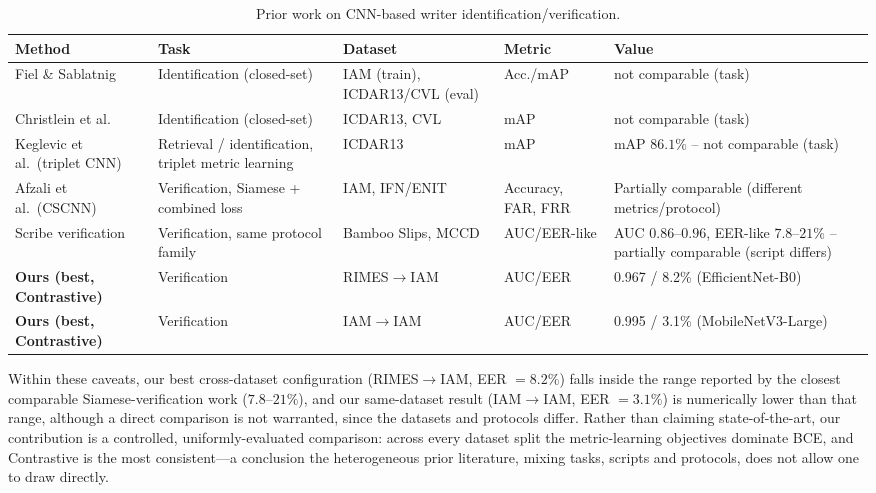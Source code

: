 \begin{table}[htbp]
  \centering
  \caption{Prior work on CNN-based writer identification/verification.}
  \label{tab:sota}
  \footnotesize
  \begin{tabularx}{\textwidth}{@{}l L L l L@{}}
    \toprule
    Method & Task & Dataset & Metric & Value \\
    \midrule
    Fiel \& Sablatnig~\cite{fiel2015} & Identification (closed-set) & IAM (train), ICDAR13/CVL (eval) & Acc./mAP & not comparable (task) \\
    Christlein et al.~\cite{christlein2017} & Identification (closed-set) & ICDAR13, CVL & mAP & not comparable (task) \\
    Keglevic et al.\ (triplet CNN)~\cite{keglevic2018} & Retrieval / identification, triplet metric learning & ICDAR13 & mAP & mAP $86.1\%$ -- not comparable (task) \\
    Afzali et al.\ (CSCNN)~\cite{afzali2024} & Verification, Siamese + combined loss & IAM, IFN/ENIT & Accuracy, FAR, FRR & Partially comparable (different metrics/protocol) \\
    Scribe verification~\cite{scribeverif2026} & Verification, same protocol family & Bamboo Slips, MCCD & AUC/EER-like & AUC $0.86$--$0.96$, EER-like $7.8$--$21\%$ -- partially comparable (script differs) \\
    \textbf{Ours (best, Contrastive)} & Verification & RIMES$\to$IAM & AUC/EER & 0.967 / 8.2\% (EfficientNet-B0) \\
    \textbf{Ours (best, Contrastive)} & Verification & IAM$\to$IAM & AUC/EER & 0.995 / 3.1\% (MobileNetV3-Large) \\
    \bottomrule
  \end{tabularx}
\end{table}

Within these caveats, our best cross-dataset configuration
(RIMES$\rightarrow$IAM, EER $=8.2\%$) falls inside the range reported by the
closest comparable Siamese-verification work ($7.8$--$21\%$), and our
same-dataset result (IAM$\rightarrow$IAM, EER $=3.1\%$) is numerically lower
than that range, although a direct comparison is not warranted, since the
datasets and protocols differ.
Rather than claiming state-of-the-art, our contribution is a controlled, uniformly-evaluated
comparison: across every dataset split the metric-learning objectives dominate
BCE, and Contrastive is the most consistent—a conclusion the heterogeneous
prior literature, mixing tasks, scripts and protocols, does not allow one to
draw directly.